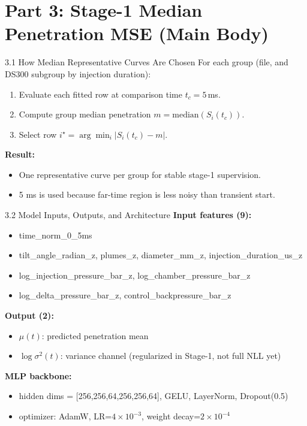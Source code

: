 \documentclass[UTF8,aspectratio=169]{ctexbeamer}
\begin{document}
\section{Part 3: Stage-1 Median Penetration MSE (Main Body)}

\begin{frame}{3.1 How Median Representative Curves Are Chosen}
For each group (file, and DS300 subgroup by injection duration):
\begin{enumerate}
  \item Evaluate each fitted row at comparison time $t_c=5\,$ms.
  \item Compute group median penetration $m=\mathrm{median}(S_i(t_c))$.
  \item Select row $i^\star = \arg\min_i |S_i(t_c)-m|$.
\end{enumerate}

\vspace{0.3em}
\textbf{Result:}
\begin{itemize}
  \item One representative curve per group for stable stage-1 supervision.
  \item 5 ms is used because far-time region is less noisy than transient start.
\end{itemize}
\end{frame}

\begin{frame}{3.2 Model Inputs, Outputs, and Architecture}
\textbf{Input features (9):}
\begin{itemize}
  \item time\_norm\_0\_5ms
  \item tilt\_angle\_radian\_z, plumes\_z, diameter\_mm\_z, injection\_duration\_us\_z
  \item log\_injection\_pressure\_bar\_z, log\_chamber\_pressure\_bar\_z
  \item log\_delta\_pressure\_bar\_z, control\_backpressure\_bar\_z
\end{itemize}

\vspace{0.3em}
\textbf{Output (2):}
\begin{itemize}
  \item $\mu(t)$: predicted penetration mean
  \item $\log \sigma^2(t)$: variance channel (regularized in Stage-1, not full NLL yet)
\end{itemize}

\vspace{0.3em}
\textbf{MLP backbone:}
\begin{itemize}
  \item hidden dims = [256,256,64,256,256,64], GELU, LayerNorm, Dropout(0.5)
  \item optimizer: AdamW, LR=$4\times 10^{-3}$, weight decay=$2\times 10^{-4}$
\end{itemize}
\end{frame}
\end{document}

